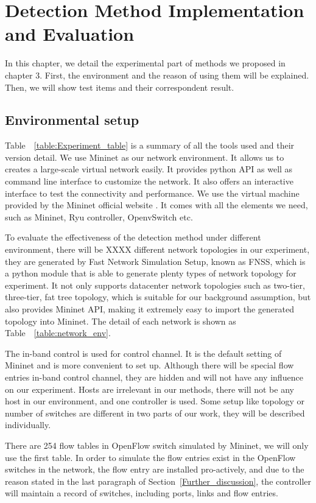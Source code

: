 \chapter{Detection Method Implementation and Evaluation}
In this chapter, we detail the experimental part of methods we proposed in chapter 3. First, the environment and the reason of using them will be explained. Then, we will show test items and their correspondent result.

\section{Environmental setup}
Table~~\ref{table:Experiment_table} is a summary of all the tools used and their version detail. We use Mininet as our network environment. It allows us to creates a large-scale virtual network easily. 
It provides python API as well as command line interface to customize the network. It also offers an interactive interface to test the connectivity and performance. We use the virtual machine provided by the Mininet official website \cite{Mininet}. It comes with all the elements we need, such as Mininet, Ryu controller, OpenvSwitch etc.
 
To evaluate the effectiveness of the detection method under different environment, there will be XXXX different network topologies in our experiment, they are generated by Fast Network Simulation Setup, known as FNSS, which is a python module that is able to generate plenty types of network topology for experiment. It not only supports datacenter network topologies such as two-tier, three-tier, fat tree topology, which is suitable for our background assumption, but also provides Mininet API, making it extremely easy to import the generated topology into Mininet. The detail of each network is shown as Table~~\ref{table:network_env}.

The in-band control is used for control channel. It is the default setting of Mininet and is more convenient to set up. Although there will be special flow entries in-band control channel, they are hidden and will not have any influence on our experiment. Hosts are irrelevant in our methods, there will not be any host in our environment, and one controller is used. Some setup like topology or number of switches are different in two parts of our work, they will be described individually.

There are 254 flow tables in OpenFlow switch simulated by Mininet, we will only use the first table. In order to simulate the flow entries exist in the OpenFlow switches in the network, the flow entry are installed pro-actively, and due to the reason stated in the last paragraph of Section~\ref{Further_discussion}, the controller will maintain a record of switches, including ports, links and flow entries. 

